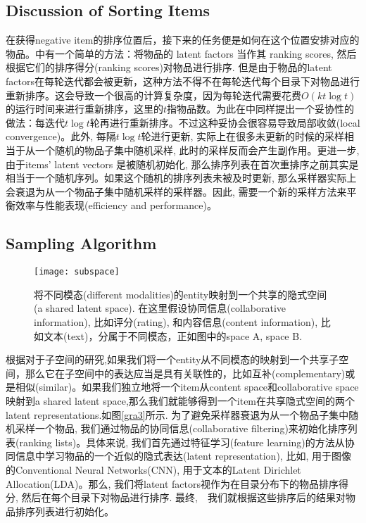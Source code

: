\subsection{Discussion of Sorting Items}
在获得negative item的排序位置后，接下来的任务便是如何在这个位置安排对应的物品。\cite{rendle2014improving}中有一个简单的方法：将物品的 latent factors 当作其 ranking scores, 然后根据它们的排序得分(ranking scores)对物品进行排序. 但是由于物品的latent factors在每轮迭代都会被更新，这种方法不得不在每轮迭代每个目录下对物品进行重新排序。这会导致一个很高的计算复杂度，因为每轮迭代需要花费$\mathit{O}\left(kt\log t\right)$的运行时间来进行重新排序，这里的$t$指物品数。为此在\cite{rendle2014improving}中同样提出一个妥协性的做法：每迭代$t \log t$轮再进行重新排序。不过这种妥协会很容易导致局部收敛(local convergence)。此外, 每隔$t\log t$轮进行更新, 实际上在很多未更新的时候的采样相当于从一个随机的物品子集中随机采样, 此时的采样反而会产生副作用。更进一步, 由于items' latent vectors 是被随机初始化, 那么排序列表在首次重排序之前其实是相当于一个随机序列。如果这个随机的排序列表未被及时更新, 那么采样器实际上会衰退为从一个物品子集中随机采样的采样器。因此, 需要一个新的采样方法来平衡效率与性能表现(efficiency and performance)。

\subsection{Sampling Algorithm}
\begin{figure}[htbp]
	\begin{center}
		\texttt{[image: subspace]}
		\caption{将不同模态(different modalities)的entity映射到一个共享的隐式空间(a shared latent space). 在这里假设协同信息(collaborative information), 比如评分(rating), 和内容信息(content information), 比如文本(text)，分属于不同模态，正如图中的space A, space B.}
		\label{gra5}
	\end{center}
\end{figure}

根据对于子空间的研究\cite{udupa2010improving,rasiwasia2010new},如果我们将一个entity从不同模态的映射到一个共享子空间，那么它在子空间中的表达应当是具有关联性的，比如互补(complementary)或是相似(similar)。如果我们独立地将一个item从content space和collaborative space映射到a shared latent space,那么我们就能够得到一个item在共享隐式空间的两个latent representations.如图\ref{gra3}所示. 为了避免采样器衰退为从一个物品子集中随机采样一个物品, 我们通过物品的协同信息(collaborative filtering)来初始化排序列表(ranking lists)。具体来说, 我们首先通过特征学习(feature learning)的方法从协同信息中学习物品的一个近似的隐式表达(latent representation), 比如, 用于图像的Conventional Neural Networks(CNN), 用于文本的Latent Dirichlet Allocation(LDA)。那么, 我们将latent factors视作为在目录分布下的物品排序得分, 然后在每个目录下对物品进行排序. 最终,　我们就根据这些排序后的结果对物品排序列表进行初始化。

